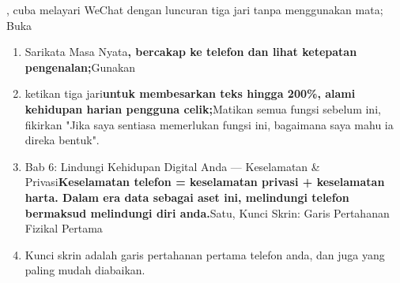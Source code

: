 \begin{tcbpractice}{, cuba melayari WeChat dengan luncuran tiga jari tanpa menggunakan mata;}
Buka

\begin{enumerate}
  \item Sarikata Masa Nyata\textbf{, bercakap ke telefon dan lihat ketepatan pengenalan;}Gunakan
  \item ketikan tiga jari\textbf{untuk membesarkan teks hingga 200\%, alami kehidupan harian pengguna celik;}Matikan semua fungsi sebelum ini, fikirkan "Jika saya sentiasa memerlukan fungsi ini, bagaimana saya mahu ia direka bentuk".
  \item Bab 6: Lindungi Kehidupan Digital Anda — Keselamatan \& Privasi\textbf{Keselamatan telefon = keselamatan privasi + keselamatan harta. Dalam era data sebagai aset ini, melindungi telefon bermaksud melindungi diri anda.}Satu, Kunci Skrin: Garis Pertahanan Fizikal Pertama
  \item Kunci skrin adalah garis pertahanan pertama telefon anda, dan juga yang paling mudah diabaikan.
\end{enumerate}

\end{tcbpractice}

